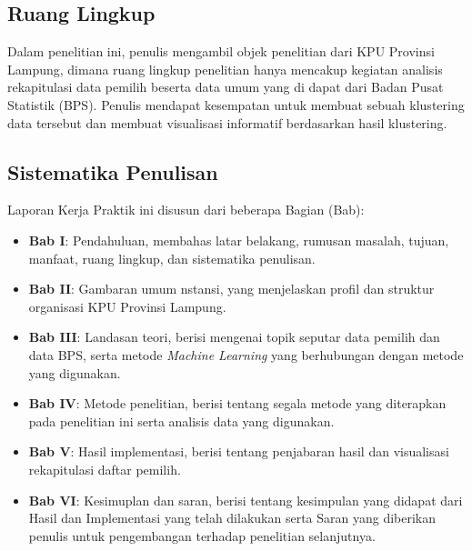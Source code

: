 \subsection{Ruang Lingkup}
Dalam penelitian ini, penulis mengambil objek penelitian dari KPU Provinsi Lampung, dimana ruang lingkup penelitian hanya mencakup kegiatan analisis rekapitulasi data pemilih beserta data umum yang di dapat dari Badan Pusat Statistik (BPS). Penulis mendapat kesempatan untuk membuat sebuah klustering data tersebut dan membuat visualisasi informatif berdasarkan hasil klustering.

\subsection{Sistematika Penulisan}
Laporan Kerja Praktik ini disusun dari beberapa Bagian (Bab):
\begin{itemize}
    \item \textbf{Bab I}: Pendahuluan, membahas latar belakang, rumusan masalah, tujuan, manfaat, ruang lingkup, dan sistematika penulisan.
    \item \textbf{Bab II}: Gambaran umum nstansi, yang menjelaskan profil dan struktur organisasi KPU Provinsi Lampung.
    \item \textbf{Bab III}: Landasan teori, berisi mengenai topik seputar data pemilih dan data BPS, serta metode \textit{Machine Learning} yang berhubungan dengan metode yang digunakan.
    \item \textbf{Bab IV}: Metode penelitian, berisi tentang segala metode yang diterapkan pada penelitian ini serta analisis data yang digunakan.
    \item \textbf{Bab V}: Hasil implementasi, berisi tentang penjabaran hasil dan visualisasi rekapitulasi daftar pemilih.
    \item \textbf{Bab VI}: Kesimuplan dan saran, berisi tentang kesimpulan yang didapat dari Hasil dan Implementasi yang telah dilakukan serta Saran yang diberikan penulis untuk pengembangan terhadap penelitian selanjutnya.
\end{itemize}

\newpage